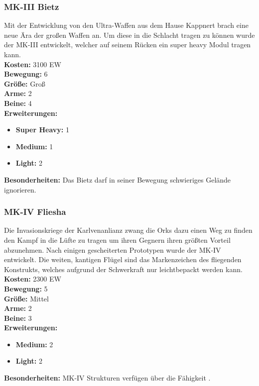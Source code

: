 \subsubsection*{MK-III Bietz}
Mit der Entwicklung von den Ultra-Waffen aus dem Hause Kappnert brach eine neue Ära der großen Waffen an. Um diese in die Schlacht tragen zu können wurde der MK-III entwickelt, welcher auf seinem Rücken ein super heavy Modul tragen kann.\\
\textbf{Kosten:} 3100 EW\\
\textbf{Bewegung:} 6 \\
\textbf{Größe:} Groß \\
\textbf{Arme:} 2 \\
\textbf{Beine:} 4 \\
\textbf{Erweiterungen:} \begin{itemize}
        \item \textbf{Super Heavy:} 1
	    \item \textbf{Medium:} 1
	    \item \textbf{Light:} 2 \end{itemize}
\textbf{Besonderheiten:} Das Bietz darf in seiner Bewegung schwieriges Gelände ignorieren.

\subsubsection*{MK-IV Fliesha}
Die Invasionskriege der Karlvenanlianz zwang die Orks dazu einen Weg zu finden den Kampf in die Lüfte zu tragen um ihren Gegnern ihren größten Vorteil abzunehmen. Nach einigen gescheiterten Prototypen wurde der MK-IV entwickelt. Die weiten, kantigen Flügel sind das Markenzeichen des fliegenden Konstrukts, welches aufgrund der Schwerkraft nur leichtbepackt werden kann. \\
\textbf{Kosten:} 2300 EW\\
\textbf{Bewegung:} 5 \\
\textbf{Größe:} Mittel \\
\textbf{Arme:} 2 \\
\textbf{Beine:} 3 \\
\textbf{Erweiterungen:} \begin{itemize}
	    \item \textbf{Medium:} 2
	    \item \textbf{Light:} 2 \end{itemize}
\textbf{Besonderheiten:} MK-IV Strukturen verfügen über die Fähigkeit \textit{}.


